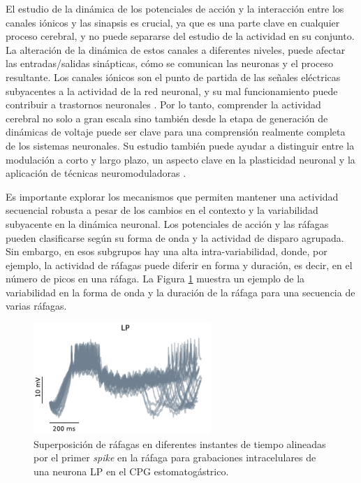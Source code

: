 El estudio de la dinámica de los potenciales de acción y la interacción entre los canales iónicos y las sinapsis es crucial, ya que es una parte clave en cualquier proceso cerebral, y no puede separarse del estudio de la actividad en su conjunto. La alteración de la dinámica de estos canales a diferentes niveles, puede afectar las entradas/salidas sinápticas, cómo se comunican las neuronas y el proceso resultante. Los canales iónicos son el punto de partida de las señales eléctricas subyacentes a la actividad de la red neuronal, y su mal funcionamiento puede contribuir a trastornos neuronales \parencite{kecskes_editorial_2023}. Por lo tanto, comprender la actividad cerebral no solo a gran escala sino también desde la etapa de generación de dinámicas de voltaje puede ser clave para una comprensión realmente completa de los sistemas neuronales. Su estudio también puede ayudar a distinguir entre la modulación a corto y largo plazo, un aspecto clave en la plasticidad neuronal y la aplicación de técnicas neuromoduladoras \parencite{chambers_light-activated_2008,burke_modulation_2019}.

Es importante explorar los mecanismos que permiten mantener una actividad secuencial robusta a pesar de los cambios en el contexto y la variabilidad subyacente en la dinámica neuronal. Los potenciales de acción y las ráfagas pueden clasificarse según su forma de onda y la actividad de disparo agrupada. Sin embargo, en esos subgrupos hay una alta intra-variabilidad, donde, por ejemplo, la actividad de ráfagas puede diferir en forma y duración, es decir, en el número de picos en una ráfaga. La Figura \ref{fig:burst variability spanish} muestra un ejemplo de la variabilidad en la forma de onda y la duración de la ráfaga para una secuencia de varias ráfagas.

\begin{figure}[htb!]
	\centering
	\includegraphics[width=0.6\textwidth]{img/intro/burst_variability.pdf}
	\caption{Superposición de ráfagas en diferentes instantes de tiempo alineadas por el primer \textit{spike} en la ráfaga para grabaciones intracelulares de una neurona LP en el CPG estomatogástrico.}
	\label{fig:burst variability spanish}
\end{figure}


